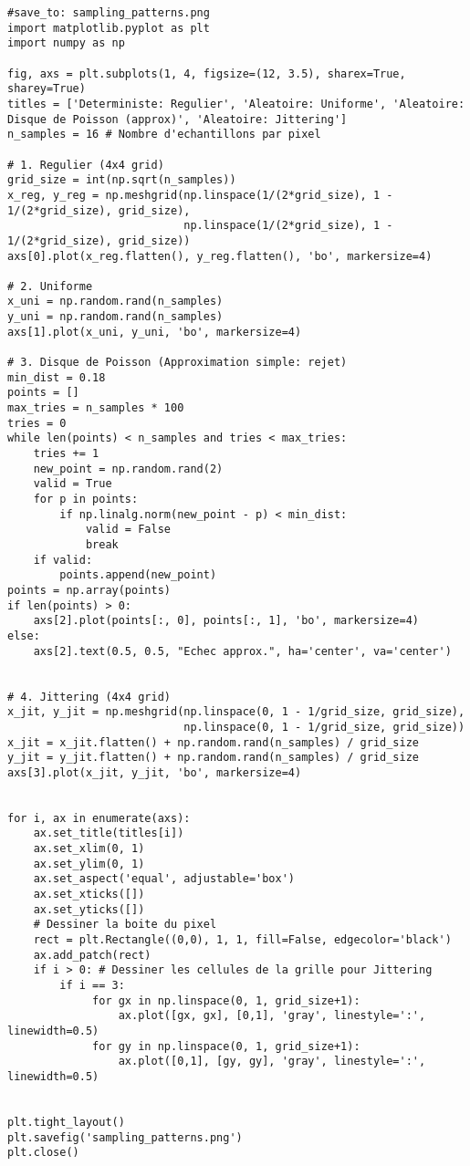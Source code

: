 \documentclass{article}
\begin{document}
\begin{verbatim}
#save_to: sampling_patterns.png
import matplotlib.pyplot as plt
import numpy as np

fig, axs = plt.subplots(1, 4, figsize=(12, 3.5), sharex=True, sharey=True)
titles = ['Deterministe: Regulier', 'Aleatoire: Uniforme', 'Aleatoire: Disque de Poisson (approx)', 'Aleatoire: Jittering']
n_samples = 16 # Nombre d'echantillons par pixel

# 1. Regulier (4x4 grid)
grid_size = int(np.sqrt(n_samples))
x_reg, y_reg = np.meshgrid(np.linspace(1/(2*grid_size), 1 - 1/(2*grid_size), grid_size),
                           np.linspace(1/(2*grid_size), 1 - 1/(2*grid_size), grid_size))
axs[0].plot(x_reg.flatten(), y_reg.flatten(), 'bo', markersize=4)

# 2. Uniforme
x_uni = np.random.rand(n_samples)
y_uni = np.random.rand(n_samples)
axs[1].plot(x_uni, y_uni, 'bo', markersize=4)

# 3. Disque de Poisson (Approximation simple: rejet)
min_dist = 0.18
points = []
max_tries = n_samples * 100
tries = 0
while len(points) < n_samples and tries < max_tries:
    tries += 1
    new_point = np.random.rand(2)
    valid = True
    for p in points:
        if np.linalg.norm(new_point - p) < min_dist:
            valid = False
            break
    if valid:
        points.append(new_point)
points = np.array(points)
if len(points) > 0:
    axs[2].plot(points[:, 0], points[:, 1], 'bo', markersize=4)
else:
    axs[2].text(0.5, 0.5, "Echec approx.", ha='center', va='center')


# 4. Jittering (4x4 grid)
x_jit, y_jit = np.meshgrid(np.linspace(0, 1 - 1/grid_size, grid_size),
                           np.linspace(0, 1 - 1/grid_size, grid_size))
x_jit = x_jit.flatten() + np.random.rand(n_samples) / grid_size
y_jit = y_jit.flatten() + np.random.rand(n_samples) / grid_size
axs[3].plot(x_jit, y_jit, 'bo', markersize=4)


for i, ax in enumerate(axs):
    ax.set_title(titles[i])
    ax.set_xlim(0, 1)
    ax.set_ylim(0, 1)
    ax.set_aspect('equal', adjustable='box')
    ax.set_xticks([])
    ax.set_yticks([])
    # Dessiner la boite du pixel
    rect = plt.Rectangle((0,0), 1, 1, fill=False, edgecolor='black')
    ax.add_patch(rect)
    if i > 0: # Dessiner les cellules de la grille pour Jittering
        if i == 3:
             for gx in np.linspace(0, 1, grid_size+1):
                 ax.plot([gx, gx], [0,1], 'gray', linestyle=':', linewidth=0.5)
             for gy in np.linspace(0, 1, grid_size+1):
                 ax.plot([0,1], [gy, gy], 'gray', linestyle=':', linewidth=0.5)


plt.tight_layout()
plt.savefig('sampling_patterns.png')
plt.close()
\end{verbatim}
\end{document}
